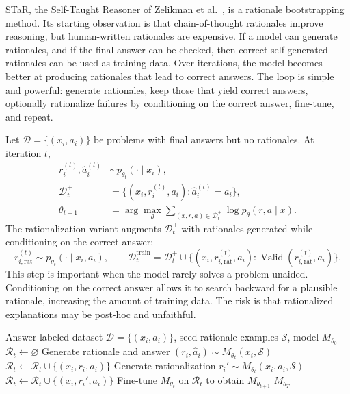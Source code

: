 STaR, the Self-Taught Reasoner of Zelikman et al.\ \cite{zelikman2022star}, is a rationale bootstrapping method. Its starting observation is that chain-of-thought rationales improve reasoning, but human-written rationales are expensive. If a model can generate rationales, and if the final answer can be checked, then correct self-generated rationales can be used as training data. Over iterations, the model becomes better at producing rationales that lead to correct answers. The loop is simple and powerful: generate rationales, keep those that yield correct answers, optionally rationalize failures by conditioning on the correct answer, fine-tune, and repeat.

Let $\mathcal{D}=\{(x_i,a_i)\}$ be problems with final answers but no rationales. At iteration $t$,
\begin{align}
    r_i^{(t)},\hat{a}_i^{(t)} &\sim p_{\theta_t}(\cdot\mid x_i),\\
    \mathcal{D}_t^{+} &= \{(x_i,r_i^{(t)},a_i): \hat{a}_i^{(t)}=a_i\},\\
    \theta_{t+1} &= \arg\max_\theta \sum_{(x,r,a)\in\mathcal{D}_t^{+}} \log p_\theta(r,a\mid x).
    \label{eq:star-basic}
\end{align}
The rationalization variant augments $\mathcal{D}_t^{+}$ with rationales generated while conditioning on the correct answer:
\begin{equation}
    r_{i,\mathrm{rat}}^{(t)} \sim p_{\theta_t}(\cdot\mid x_i,a_i), \qquad
    \mathcal{D}_t^{\mathrm{train}}=\mathcal{D}_t^{+}\cup\{(x_i,r_{i,\mathrm{rat}}^{(t)},a_i): \operatorname{Valid}(r_{i,\mathrm{rat}}^{(t)},a_i)\}.
\end{equation}
This step is important when the model rarely solves a problem unaided. Conditioning on the correct answer allows it to search backward for a plausible rationale, increasing the amount of training data. The risk is that rationalized explanations may be post-hoc and unfaithful.

\begin{algorithm}[t]
\caption{STaR rationale bootstrapping}
\label{alg:star}
\begin{algorithmic}[1]
\Require Answer-labeled dataset $\mathcal{D}=\{(x_i,a_i)\}$, seed rationale examples $\mathcal{S}$, model $M_{\theta_0}$
    \State $\mathcal{R}_t\gets\varnothing$
        \State Generate rationale and answer $(r_i,\hat{a}_i)\sim M_{\theta_t}(x_i,\mathcal{S})$
            \State $\mathcal{R}_t\gets\mathcal{R}_t\cup\{(x_i,r_i,a_i)\}$
        \Else
            \State Generate rationalization $r_i'\sim M_{\theta_t}(x_i,a_i,\mathcal{S})$
                \State $\mathcal{R}_t\gets\mathcal{R}_t\cup\{(x_i,r_i',a_i)\}$
            \EndIf
        \EndIf
    \EndFor
    \State Fine-tune $M_{\theta_t}$ on $\mathcal{R}_t$ to obtain $M_{\theta_{t+1}}$
\EndFor
\State \Return $M_{\theta_T}$
\end{algorithmic}
\end{algorithm}

